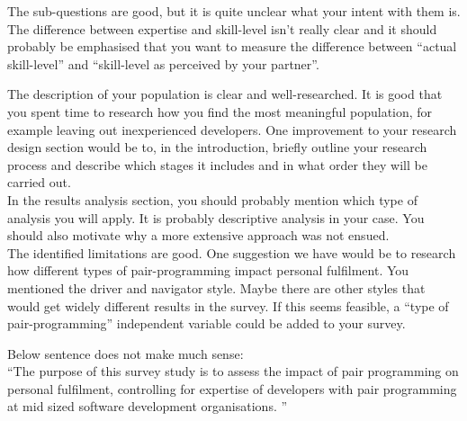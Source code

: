 \documentclass[times, 10pt,twocolumn]{IEEEtran}
\begin{document}
The sub-questions are good, but it is quite unclear what your intent with them is. The difference between expertise and skill-level isn't really clear and it should probably be emphasised that you want to measure the difference between ``actual skill-level'' and ``skill-level as perceived by your partner''. 


The description of your population is clear and well-researched. It is good that you spent time to research how you find the most meaningful population, for example leaving out inexperienced developers. One improvement to your research design section would be to, in the introduction, briefly outline your research process and describe which stages it includes and in what order they will be carried out. 
\\

In the results analysis section, you should probably mention which type of analysis you will apply. It is probably descriptive analysis in your case. You should also motivate why a more extensive approach was not ensued. 
\\

The identified limitations are good. One suggestion we have would be to research how different types of pair-programming impact personal fulfilment. You mentioned the driver and navigator style. Maybe there are other styles that would get widely different results in the survey. If this seems feasible, a ``type of pair-programming'' independent variable could be added to your survey. 


Below sentence does not make much sense: \\
``The purpose of this survey study is to assess the impact of pair programming on personal fulfilment, controlling for expertise of developers with pair programming at mid sized software development organisations. ''
\end{document}
